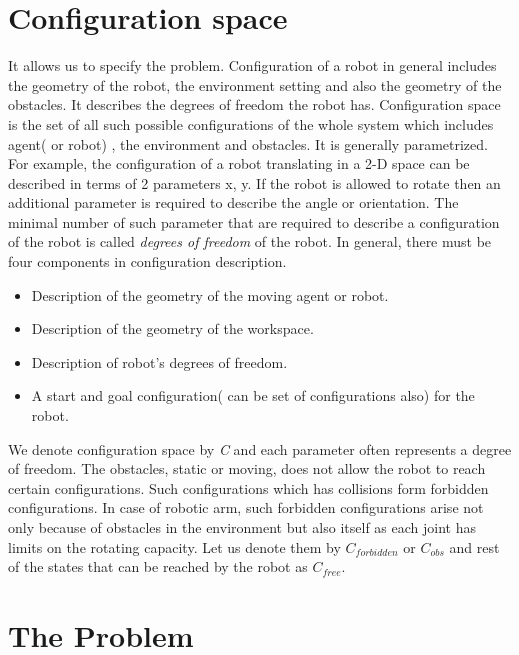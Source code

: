 \documentclass[MTech]{iitmdiss}
\begin{document}
\section{Configuration space}
  
It allows us to specify the problem. Configuration of a robot in general includes the geometry of the robot, the environment setting and also the geometry of the obstacles. It describes the degrees of freedom the robot has. Configuration space is the set of all such possible configurations of the whole system which includes agent( or robot) , the environment and obstacles. It is generally parametrized. For example, the configuration of a robot translating in a 2-D space can be described in terms of 2 parameters x, y. If the robot is allowed to rotate then an additional parameter is required to describe the angle or orientation. The minimal number of such parameter that are required to describe a configuration of the robot is called \textit{degrees of freedom} of the robot. 
In general, there must be four components in configuration description.

\begin{itemize}
\item Description of the geometry of the moving agent or robot.
\item Description of the geometry of the workspace.
\item Description of robot's degrees of freedom.
\item A start and goal configuration( can be set of configurations also)  for the robot.
\end{itemize}

We denote configuration space by \emph{C} and each parameter often represents a degree of freedom.
The obstacles, static or moving, does not allow the robot to reach certain configurations. Such configurations which has collisions form forbidden configurations. In case of robotic arm, such forbidden configurations arise not only because of obstacles in the environment but also itself as each joint has limits on the rotating capacity. Let us denote them by \emph{$C_{forbidden}$} or \emph{$C_{obs}$} and rest of the states that can be reached by the robot as \emph{$C_{free}$}. 

\section{The Problem}
\end{document}
